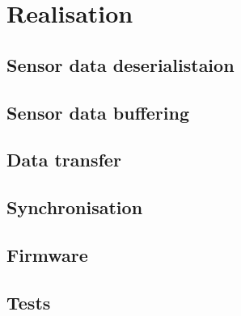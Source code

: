 \chapter{Realisation}
\section{Sensor data deserialistaion}
\section{Sensor data buffering}
\section{Data transfer}
\section{Synchronisation}
\section{Firmware}
\section{Tests}
%
%


